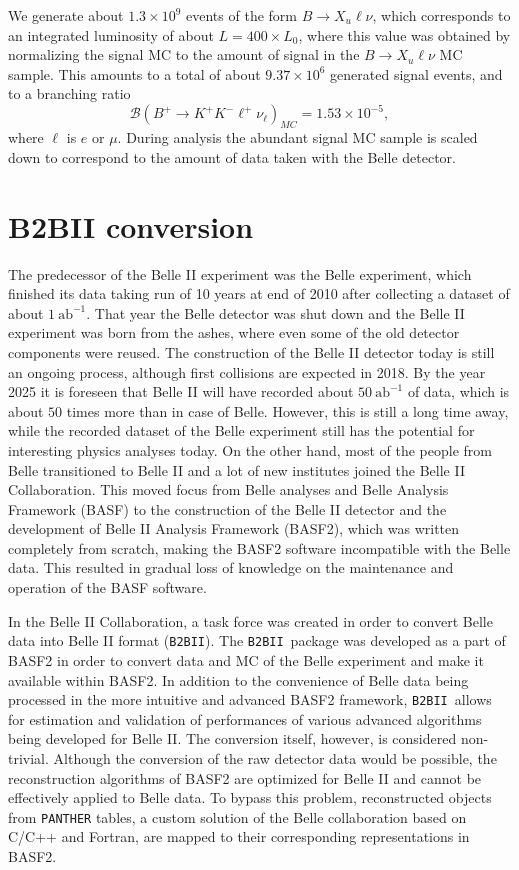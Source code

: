 \documentclass[headings=standardclasses,headings=big,oneside,a4paper,openany,12pt]{scrbook}
\newcommand {\e}[1]{\mathrm{~#1}}
\newcommand {\E}[1]{\times 10^{#1}}
\newcommand {\btbii}{\texttt{B2BII}}
\begin{document}
We generate about $1.3\E{9}$ events of the form $B\to X_u \ell \nu$, which corresponds to an integrated luminosity of about $L = 400\times L_0$, where this value was obtained by normalizing the signal MC to the amount of signal in the $B\to X_u \ell \nu$ MC sample. This amounts to a total of about $9.37\E{6}$ generated signal events, and to a branching ratio
\begin{equation}
\mathcal{B}\left(B^+ \to K^+ K^- \ell^+ \nu_\ell\right)_{MC} = 1.53\E{-5},
\end{equation}
where $\ell$ is $e$ or $\mu$. During analysis the abundant signal MC sample is scaled down to correspond to the amount of data taken with the Belle detector.

\chapter{B2BII conversion}

The predecessor of the Belle II experiment was the Belle experiment, which finished its data taking run of 10 years at end of 2010 after collecting a dataset of about $1\e{ab^{-1}}$. That year the Belle detector was shut down and the Belle II experiment was born from the ashes, where even some of the old detector components were reused. The construction of the Belle II detector today is still an ongoing process, although first collisions are expected in 2018. By the year 2025 it is foreseen that Belle II will have recorded about $50\e{ab^{-1}}$ of data, which is about $50$ times more than in case of Belle. However, this is still a long time away, while the recorded dataset of the Belle experiment still has the potential for interesting physics analyses today. On the other hand, most of the people from Belle transitioned to Belle II and a lot of new institutes joined the Belle II Collaboration. This moved focus from Belle analyses and Belle Analysis Framework (BASF) to the construction of the Belle II detector and the development of Belle II Analysis Framework (BASF2), which was written completely from scratch, making the BASF2 software incompatible with the Belle data. This resulted in gradual loss of knowledge on the maintenance and operation of the BASF software.

In the Belle II Collaboration, a task force was created in order to convert Belle data into Belle II format (\btbii). The \btbii~package was developed as a part of BASF2 in order to convert data and MC of the Belle experiment and make it available within BASF2. In addition to the convenience of Belle data being processed in the more intuitive and advanced BASF2 framework, \btbii~allows for estimation and validation of performances of various advanced algorithms being developed for Belle II. The conversion itself, however, is considered non-trivial. Although the conversion of the raw detector data would be possible, the reconstruction algorithms of BASF2 are optimized for Belle II and cannot be effectively applied to Belle data. To bypass this problem, reconstructed objects from \texttt{PANTHER} tables, a custom solution of the Belle collaboration based on C/C++ and Fortran, are mapped to their corresponding representations in BASF2.
\end{document}
